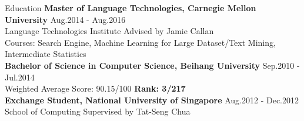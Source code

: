 \documentclass{resume} %
\begin{document}

\begin{rSection}{Education}
{\bf Master of Language Technologies, Carnegie Mellon University} \hfill {Aug.2014 - Aug.2016} \\
Language Technologies Institute \hfill Advised by Jamie Callan \\
Courses: Search Engine, Machine Learning for Large Dataset/Text Mining, Intermediate Statistics \\
{\bf Bachelor of Science in Computer Science, Beihang University} \hfill {Sep.2010 - Jul.2014} \\
Weighted Average Score: 90.15/100 \textbf{Rank: 3/217}\\
{\bf Exchange Student, National University of Singapore} \hfill {Aug.2012 - Dec.2012} \\
School of Computing \hfill Supervised by Tat-Seng Chua \\

\vspace{-2em} %
\end{rSection}

\end{document}
